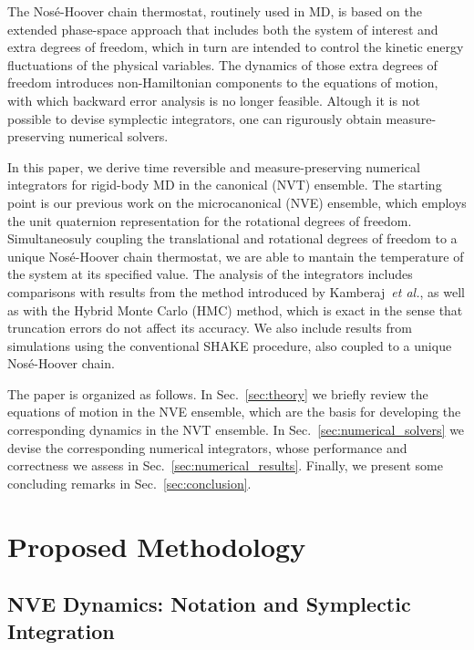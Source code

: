 \documentclass[
journal=jctcce,
layout=twocolumn
]{achemso}
\begin{document}
The Nos\'{e}-Hoover chain thermostat,\cite{Martyna_1992} routinely used in MD, is based on the extended phase-space approach that includes both the system of interest and extra degrees of freedom, which in turn are intended to control the kinetic energy fluctuations of the physical variables.
The dynamics of those extra degrees of freedom introduces non-Hamiltonian components to the equations of motion, with which backward error analysis is no longer feasible.
Altough it is not possible to devise symplectic integrators, one can rigurously obtain measure-preserving numerical solvers.\cite{Sergi_2001, Ezra_2004, Ezra_2006}

In this paper, we derive time reversible and measure-preserving numerical integrators for rigid-body MD in the canonical (NVT) ensemble.
The starting point is our previous work on the microcanonical (NVE) ensemble,\citep{Silveira_2017} which employs the unit quaternion representation for the rotational degrees of freedom.
Simultaneosuly coupling the translational and rotational degrees of freedom to a unique Nos\'{e}-Hoover chain thermostat, we are able to mantain the temperature of the system at its specified value.
The analysis of the integrators includes comparisons with results from the method introduced by Kamberaj~\textit{et al.},\cite{Kamberaj_2005} as well as with the Hybrid Monte Carlo (HMC) method,\cite{Duane_1987} which is exact in the sense that truncation errors do not affect its accuracy.
We also include results from simulations using the conventional SHAKE\cite{Ryckaert_1977} procedure, also coupled to a unique Nos\'{e}-Hoover chain.

The paper is organized as follows.
In Sec.~\ref{sec:theory} we briefly review the equations of motion in the NVE ensemble, which are the basis for developing the corresponding dynamics in the NVT ensemble.
In Sec.~\ref{sec:numerical_solvers} we devise the corresponding numerical integrators, whose performance and correctness we assess in Sec.~\ref{sec:numerical_results}.
Finally, we present some concluding remarks in Sec.~\ref{sec:conclusion}.

\section{Proposed Methodology}
\label{sec:methodology}

\subsection{NVE Dynamics: Notation and Symplectic Integration}
\end{document}
